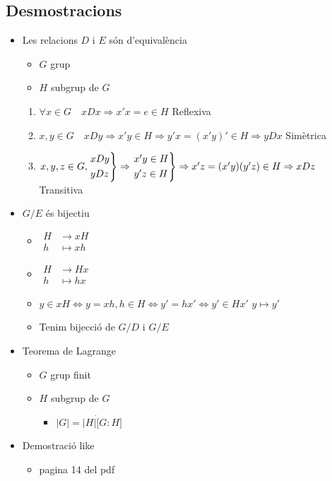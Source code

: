 \documentclass{article}
\begin{document}
\subsection*{Desmostracions}
\begin{itemize}
\item Les relacions $D$ i $E$ són d'equivalència
	\begin{itemize}
	\item $G$ grup
	\item $H$ subgrup de $G$
	\end{itemize}
	\begin{enumerate}
	\item $\forall x \in G\quad xDx \Rightarrow x'x = e \in H$ Reflexiva
	\item $x, y \in G\quad xDy \Rightarrow x'y \in H \Rightarrow y'x = (x'y)' \in H \Rightarrow yDx$ Simètrica
	\item $x, y, z \in G,
		\begin{rcases}
		xDy\\
		yDz
		\end{rcases}
		\Rightarrow
		\begin{rcases}
		x'y \in H\\
		y'z \in H
		\end{rcases}
		\Rightarrow
		x'z = (x'y)(y'z) \in H \Rightarrow xDz
		$ Transitiva
	\end{enumerate}
\item $G/E$ és bijectiu
	\begin{itemize}
	\item $
		\begin{array}{cc}
		H & \to xH \\
		h & \mapsto xh
		\end{array}
		$
	\item $
		\begin{array}{cc}
		H & \to Hx \\
		h & \mapsto hx
		\end{array}
		$
	\item $y \in xH \Leftrightarrow y = xh, h \in H \Leftrightarrow y' = hx' \Leftrightarrow y' \in Hx'$
		\subitem $y \mapsto y'$
	\item Tenim bijecció de $G/D$ i $G/E$
	\end{itemize}
\item Teorema de Lagrange
	\begin{itemize}
	\item $G$ grup finit
	\item $H$ subgrup de $G$
		\begin{itemize}
		\item $|G| = |H|\dot [G:H]$
		\end{itemize}
	\end{itemize}
\item Demostració like
	\begin{itemize}
	\item pagina 14 del pdf
	\end{itemize}
\end{itemize}
\end{document}
